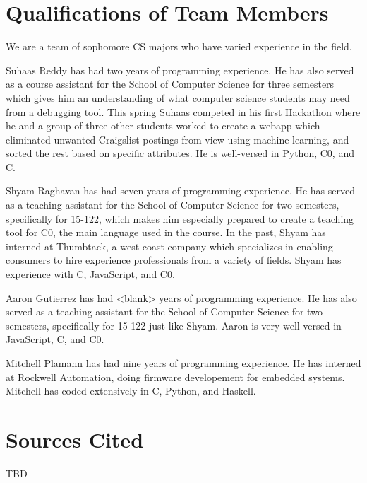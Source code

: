 \documentclass[11pt]{article}
\begin{document}
\section{Qualifications of Team Members}
\par
We are a team of sophomore CS majors who have varied experience in the field.
\par
Suhaas Reddy has had two years of programming experience.
He has also served as a course assistant for the School of Computer Science
for three semesters which gives him an understanding of what computer science students may
need from a debugging tool. This spring Suhaas competed in his first Hackathon where he and a
group of three other students worked to create a webapp which eliminated unwanted Craigslist
postings from view using machine learning, and sorted the rest based on specific attributes.
He is well-versed in Python, C0, and C.
\par
Shyam Raghavan has had seven years of programming experience.
He has served as a teaching assistant for the School of Computer Science for two semesters,
specifically for 15-122, which makes him especially prepared to create a teaching tool for C0,
the main language used in the course.
In the past, Shyam has interned at Thumbtack, a west coast company which specializes in
enabling consumers to hire experience professionals from a variety of fields.
Shyam has experience with C, JavaScript, and C0.
\par
Aaron Gutierrez has had <blank> years of programming experience.
He has also served as a teaching assistant for the School of Computer Science for two semesters,
specifically for 15-122 just like Shyam. Aaron is very well-versed in JavaScript, C, and C0.
\par
Mitchell Plamann has had nine years of programming experience.
He has interned at Rockwell Automation, doing firmware developement for embedded systems.
Mitchell has coded extensively in C, Python, and Haskell. %

\section{Sources Cited}
TBD
\end{document}
